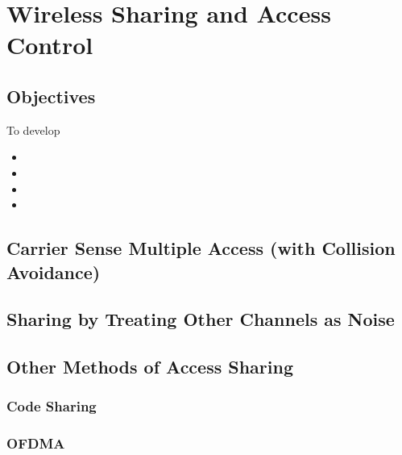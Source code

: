 \chapter{Wireless Sharing and Access Control}\label{waccess}

\minitoc 

\clearpage
\section*{Objectives}
To develop 
\begin{itemize}

\item 

\item 

\item 

\item 

\end{itemize}

\section{Carrier Sense Multiple Access (with Collision Avoidance)}


\section{Sharing by Treating Other Channels as Noise}

\section{Other Methods of Access Sharing}

\subsection{Code Sharing}

\subsection{OFDMA}
